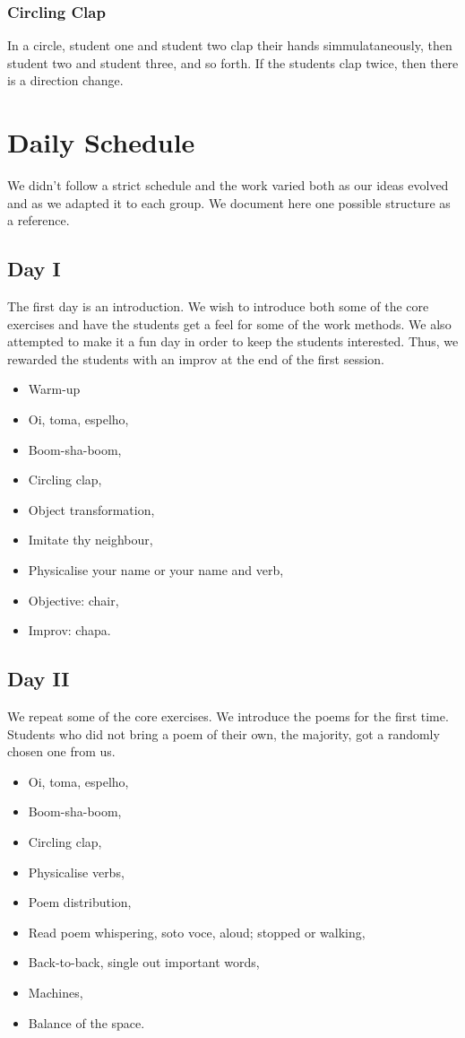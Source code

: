 \documentclass[article,twocolumn,twoside]{memoir}
\begin{document}
\subsection{Circling Clap}
In a circle, student one and student two clap their hands simmulataneously,
then student two and student three, and so forth. If the students clap twice,
then there is a direction change.

\chapter{Daily Schedule}

We didn't follow a strict schedule and the work varied both as our ideas
evolved and as we adapted it to each group. We document here one possible
structure as a reference.

\section{Day I}
The first day is an introduction. We wish to introduce both some of the core
exercises and have the students get a feel for some of the work methods. We
also attempted to make it a fun day in order to keep the students interested.
Thus, we rewarded the students with an improv at the end of the first session.

\begin{itemize}
\item Warm-up
\item Oi, toma, espelho,
\item Boom-sha-boom,
\item Circling clap,
\item Object transformation,
\item Imitate thy neighbour,
\item Physicalise your name or your name and verb,
\item Objective: chair,
\item Improv: chapa.
\end{itemize}
\section{Day II}

We repeat some of the core exercises. We introduce the poems for the first
time. Students who did not bring a poem of their own, the majority, got a
randomly chosen one from us.

\begin{itemize}
\item Oi, toma, espelho,
\item Boom-sha-boom,
\item Circling clap,
\item Physicalise verbs,
\item Poem distribution,
\item Read poem whispering, soto voce, aloud; stopped or walking,
\item Back-to-back, single out important words,
\item Machines,
\item Balance of the space.
\end{itemize}
\end{document}
